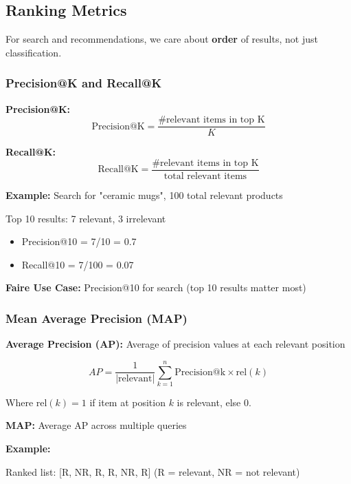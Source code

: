 \documentclass[11pt,letterpaper]{article}
\begin{document}
\subsection{Ranking Metrics}

For search and recommendations, we care about \textbf{order} of results, not just classification.

\subsubsection{Precision@K and Recall@K}

\textbf{Precision@K:}
\begin{equation}
\text{Precision@K} = \frac{\text{\# relevant items in top K}}{K}
\end{equation}

\textbf{Recall@K:}
\begin{equation}
\text{Recall@K} = \frac{\text{\# relevant items in top K}}{\text{total relevant items}}
\end{equation}

\textbf{Example:} Search for "ceramic mugs", 100 total relevant products

Top 10 results: 7 relevant, 3 irrelevant
\begin{itemize}
    \item Precision@10 = 7/10 = 0.7
    \item Recall@10 = 7/100 = 0.07
\end{itemize}

\textbf{Faire Use Case:} Precision@10 for search (top 10 results matter most)

\subsubsection{Mean Average Precision (MAP)}

\textbf{Average Precision (AP):} Average of precision values at each relevant position

\begin{equation}
AP = \frac{1}{|\text{relevant}|} \sum_{k=1}^{n} \text{Precision@k} \times \text{rel}(k)
\end{equation}

Where $\text{rel}(k) = 1$ if item at position $k$ is relevant, else 0.

\textbf{MAP:} Average AP across multiple queries

\textbf{Example:}

Ranked list: [R, NR, R, R, NR, R] (R = relevant, NR = not relevant)
\end{document}
